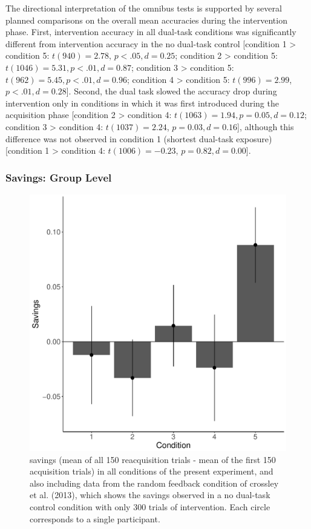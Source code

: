 \documentclass[man,apacite,draftfirst]{apa6} \usepackage{amsmath}
\begin{document}
The directional interpretation of the omnibus tests is supported by several
planned comparisons on the overall mean accuracies during the intervention
phase. First, intervention accuracy in all dual-task conditions was
significantly different from intervention accuracy in the no dual-task control
[condition 1 > condition 5: $t(940) = 2.78$, $p < .05, d = 0.25$; condition 2 >
condition 5: $t(1046) = 5.31, p < .01, d = 0.87$; condition 3 > condition 5:
$t(962) = 5.45, p < .01, d = 0.96$; condition 4 > condition 5: $t(996) = 2.99$,
$p < .01, d = 0.28$]. Second, the dual task slowed the accuracy drop during
intervention only in conditions in which it was first introduced during the
acquisition phase [condition 2 > condition 4: $t(1063) = 1.94, p = 0.05, d =
0.12$; condition 3 > condition 4: $t(1037) = 2.24$, $p = 0.03, d = 0.16$],
although this difference was not observed in condition 1 (shortest dual-task
exposure) [condition 1 > condition 4: $t(1006) = -0.23$, $p = 0.82, d = 0.00$].

\subsubsection*{Savings: Group Level}
\begin{figure}[t]
\centering \includegraphics[width=1.0\textwidth]{../figures/fig_savings.pdf}
  \caption{ savings (mean of all 150 reacquisition trials - mean of the first
150 acquisition trials) in all conditions of the present experiment, and also
including data from the random feedback condition of crossley et al. (2013),
which shows the savings observed in a no dual-task control condition with only
300 trials of intervention. Each circle corresponds to a single participant. }
  \label{fig:savings}
\end{figure}
\end{document}
